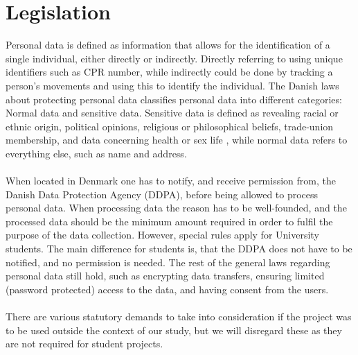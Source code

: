 
\section{Legislation}
\label{sec:legislation}

Personal data is defined as information that allows for the identification of a single individual, either directly or indirectly. Directly referring to using unique identifiers such as CPR number, while indirectly could be done by tracking a person's movements and using this to identify the individual. The Danish laws about protecting personal data classifies personal data into different categories: Normal data and sensitive data. Sensitive data is defined as revealing racial or ethnic origin, political opinions, religious or philosophical beliefs, trade-union membership, and data concerning health or sex life \parencite{datatilsynet_stud1}, while normal data refers to everything else, such as name and address.  
\\\\
When located in Denmark one has to notify, and receive permission from, the Danish Data Protection Agency (DDPA), before being allowed to process personal data. When processing data the reason has to be well-founded, and the processed data should be the minimum amount required in order to fulfil the purpose of the data collection. However, special rules apply for University students. The main difference for students is, that the DDPA does not have to be notified, and no permission is needed. The rest of the general laws regarding personal data still hold, such as encrypting data transfers, ensuring limited (password protected) access to the data, and having consent from the users. 
\\\\
There are various statutory demands to take into consideration if the project was to be used outside the context of our study, but we will disregard these as they are not required for student projects. 





